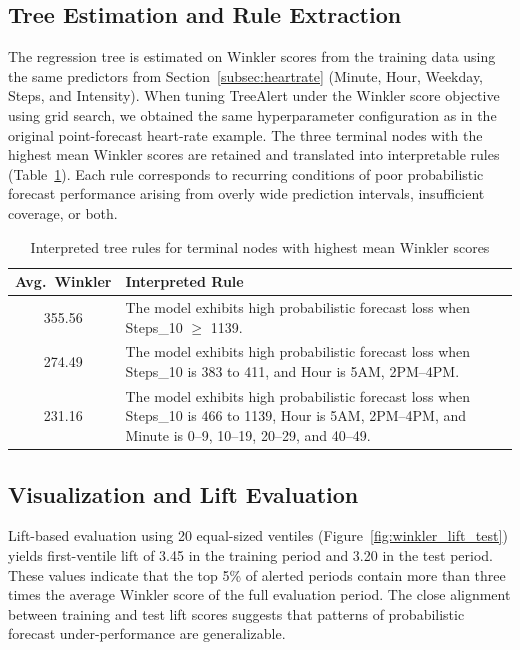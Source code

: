 \documentclass[]{interact}
\theoremstyle{plain}
\theoremstyle{definition}
\theoremstyle{remark}
\begin{document}
\subsection*{Tree Estimation and Rule Extraction}

The regression tree is estimated on Winkler scores from the training data using the same predictors from Section~\ref{subsec:heartrate} (Minute, Hour, Weekday, Steps, and Intensity). When tuning TreeAlert under the Winkler score objective using grid search, we obtained the same hyperparameter configuration as in the original point-forecast heart-rate example. The three terminal nodes with the highest mean Winkler scores are retained and translated into interpretable rules (Table~\ref{tab:winkler_rules}). Each rule corresponds to recurring conditions of poor probabilistic forecast performance arising from overly wide prediction intervals, insufficient coverage, or both.

\begin{table}
\centering
\caption{Interpreted tree rules for terminal nodes with highest mean Winkler scores}
\label{tab:winkler_rules}
\small
\begin{tabular}{c p{11cm}}
\hline
\textbf{Avg.~Winkler} & \textbf{Interpreted Rule} \\
\hline
355.56 & The model exhibits high probabilistic forecast loss when Steps\_10 $\geq$ 1139. \\
274.49 & The model exhibits high probabilistic forecast loss when Steps\_10 is 383 to 411, and Hour is 5AM, 2PM--4PM. \\
231.16 & The model exhibits high probabilistic forecast loss when Steps\_10 is 466 to 1139, Hour is 5AM, 2PM--4PM, and Minute is 0--9, 10--19, 20--29, and 40--49. \\
\hline
\end{tabular}
\end{table}

\subsection*{Visualization and Lift Evaluation}

Lift-based evaluation using 20 equal-sized ventiles (Figure~\ref{fig:winkler_lift_test}) yields first-ventile lift of 3.45 in the training period and 3.20 in the test period. These values indicate that the top 5\% of alerted periods contain more than three times the average Winkler score of the full evaluation period. The close alignment between training and test lift scores suggests that patterns of probabilistic forecast under-performance are generalizable.
\end{document}
